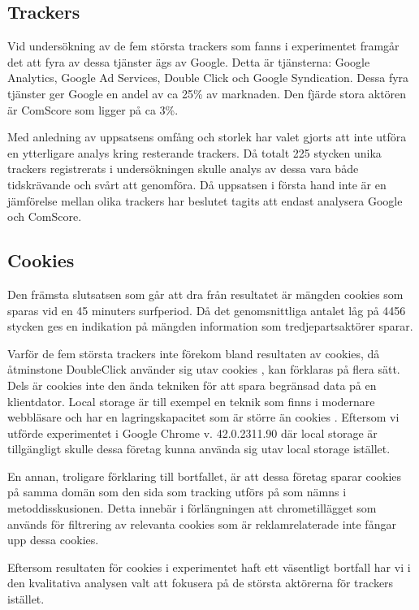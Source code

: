 \documentclass[a4paper,11pt]{article}
\begin{document}
{\subsection{Trackers}
Vid undersökning av de fem största trackers som fanns i experimentet framgår det att fyra av dessa tjänster ägs av Google. Detta är tjänsterna: Google Analytics, Google Ad Services, Double Click och Google Syndication. Dessa fyra tjänster ger Google en andel av ca 25\% av marknaden. Den fjärde stora aktören är ComScore som ligger på ca 3\%.

Med anledning av uppsatsens omfång och storlek har valet gjorts att inte utföra en ytterligare analys kring resterande trackers. Då totalt 225 stycken unika trackers registrerats i undersökningen skulle analys av dessa vara både tidskrävande och svårt att genomföra. Då uppsatsen i första hand inte är en jämförelse mellan olika trackers har beslutet tagits att endast analysera Google och ComScore.

\subsection{Cookies}
Den främsta slutsatsen som går att dra från resultatet är mängden cookies som sparas vid en 45 minuters surfperiod. Då det genomsnittliga antalet låg på 4456 stycken ges en indikation på mängden information som tredjepartsaktörer sparar.

Varför de fem största trackers inte förekom bland resultaten av cookies, då åtminstone DoubleClick använder sig utav cookies \cite{GuardianDoubleClick}, kan förklaras på flera sätt. Dels är cookies inte den ända tekniken för att spara begränsad data på en klientdator. Local storage är till exempel en teknik som finns i modernare webbläsare och har en lagringskapacitet som är större än cookies \cite{MDN}. Eftersom vi utförde experimentet i Google Chrome v. 42.0.2311.90 där local storage är tillgängligt skulle dessa företag kunna använda sig utav local storage istället.

En annan, troligare förklaring till bortfallet, är att dessa företag sparar cookies på samma domän som den sida som tracking utförs på som nämns i metoddisskusionen. Detta innebär i förlängningen att chrometillägget som används för filtrering av relevanta cookies som är reklamrelaterade inte fångar upp dessa cookies.

Eftersom resultaten för cookies i experimentet haft ett väsentligt bortfall har vi i den kvalitativa analysen  valt att fokusera på de största aktörerna för trackers istället.  

}
\end{document}
